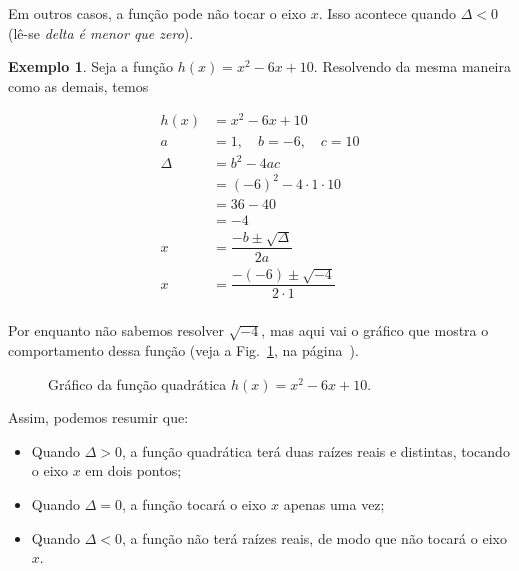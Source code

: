 \documentclass[12pt,openright,twoside,a4paper]{article}
\theoremstyle{definition}
\newtheorem{example}{Exemplo}[section]
\begin{document}
	Em outros casos, a função pode não tocar o eixo $x$. Isso acontece quando $\Delta < 0$ (lê-se \textit{delta é menor que zero}).
	\begin{example}
		Seja a função $h(x) = x^2 - 6x + 10$. Resolvendo da mesma maneira como as demais, temos
		
		\begin{align*}
			h(x) &= x^2 - 6x + 10 \\
			a &= 1,\quad b = -6,\quad c = 10 \\
			\Delta &= b^2 - 4ac \\
			&= (-6)^2 - 4 \cdot 1 \cdot 10 \\
			&= 36 - 40 \\
			&= -4 \\
			x &= \dfrac{-b \pm \sqrt{\Delta}}{2a} \\
			x &= \dfrac{-(-6) \pm \sqrt{-4}}{2 \cdot 1} \\
		\end{align*}
		
		Por enquanto não sabemos resolver $\sqrt{-4}$, mas aqui vai o gráfico que mostra o comportamento dessa função (veja a Fig.~\ref{fig:funcao_h}, na página~\pageref{fig:funcao_h}).
		
		\begin{figure}[h]
			\centering
			\caption{Gráfico da função quadrática $h(x) = x^2 - 6x + 10$.}
			\label{fig:funcao_h}
		\end{figure}
	\end{example}
	
	Assim, podemos resumir que:
	
	\begin{itemize}
		\item Quando $\Delta > 0$, a função quadrática terá duas raízes reais e distintas, tocando o eixo $x$ em dois pontos;
		\item Quando $\Delta = 0$, a função tocará o eixo $x$ apenas uma vez;
		\item Quando $\Delta < 0$, a função não terá raízes reais, de modo que não tocará o eixo $x$.
	\end{itemize}
	
\end{document}
